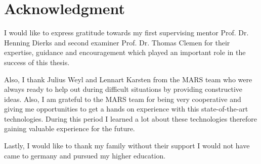 \newpage
\thispagestyle{empty}
\section*{Acknowledgment}
I would like to express gratitude towards my first supervising mentor Prof. Dr. Henning Dierks and second examiner Prof. Dr. Thomas Clemen for their expertise, guidance and 
encouragement which played an important role in the success of this thesis. 

Also, I thank Julius Weyl and Lennart Karsten from the MARS team who were always ready to help out during difficult situations by providing constructive
ideas. Also, I am grateful to the MARS team for being very cooperative and giving me opportunities to get a hands on experience with this state-of-the-art technologies.
During this period I learned a lot about these technologies therefore
gaining valuable experience for the future.

Lastly, I would like to thank my family without their support I would not have came to germany and pursued my higher education.
